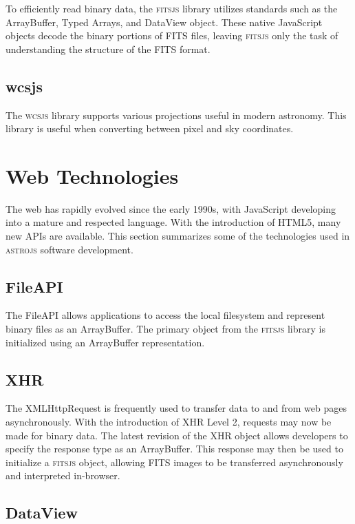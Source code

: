 \documentclass[11pt,twoside]{article}
\begin{document}
To efficiently read binary data, the \textsc{fitsjs} library utilizes standards such as the ArrayBuffer, Typed Arrays, and DataView object.  These native JavaScript objects decode the binary portions of FITS files, leaving \textsc{fitsjs} only the task of understanding the structure of the FITS format.

\subsection{wcsjs}

The \textsc{wcsjs} library supports various projections \citep{2002A&A...395.1077C} useful in modern astronomy.  This library is useful when converting between pixel and sky coordinates.

\section{Web Technologies}

The web has rapidly evolved since the early 1990s, with JavaScript developing into a mature and respected language.  With the introduction of HTML5, many new APIs are available.  This section summarizes some of the technologies used in \textsc{astrojs} software development.

\subsection{FileAPI}

The FileAPI \citep{W3CFileAPI} allows applications to access the local filesystem and represent binary files as an ArrayBuffer.  The primary object from the \textsc{fitsjs} library is initialized using an ArrayBuffer representation.

\subsection{XHR}

The XMLHttpRequest \citep{W3CXHR} is frequently used to transfer data to and from web pages asynchronously.  With the introduction of XHR Level 2, requests may now be made for binary data.  The latest revision of the XHR object allows developers to specify the response type as an ArrayBuffer.  This response may then be used to initialize a \textsc{fitsjs} object, allowing FITS images to be transferred asynchronously and interpreted in-browser.

\subsection{DataView}
\end{document}
